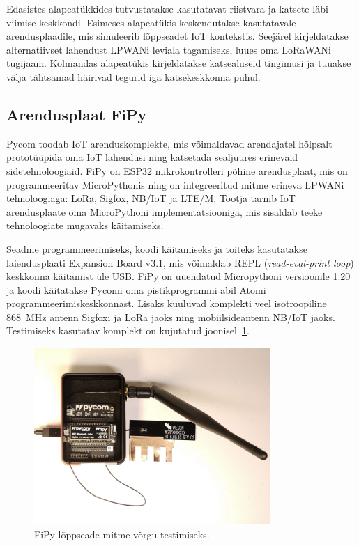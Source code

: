 \documentclass[12pt]{article}
\begin{document}
    Edasistes alapeatükkides tutvustatakse kasutatavat riistvara ja katsete läbi viimise keskkondi.
    Esimeses alapeatükis keskendutakse kasutatavale arendusplaadile, mis simuleerib lõppseadet IoT kontekstis.
    Seejärel kirjeldatakse alternatiivset lahendust LPWANi leviala tagamiseks, luues oma LoRaWANi tugijaam.
    Kolmandas alapeatükis kirjeldatakse katsealuseid tingimusi ja tuuakse välja tähtsamad häirivad tegurid iga katsekeskkonna puhul.

    \subsection{Arendusplaat FiPy}

    Pycom toodab IoT arenduskomplekte, mis võimaldavad arendajatel hõlpsalt prototüüpida oma IoT lahendusi ning katsetada sealjuures erinevaid sidetehnoloogiaid.
    FiPy on ESP32 mikrokontrolleri põhine arendusplaat, mis on programmeeritav MicroPythonis ning on integreeritud mitme erineva LPWANi tehnoloogiaga: LoRa, Sigfox, NB\=/IoT ja LTE\=/M.
    Tootja tarnib IoT arendusplaate oma MicroPythoni implementatsiooniga, mis sisaldab teeke tehnoloogiate mugavaks käitamiseks.

    Seadme programmeerimiseks, koodi käitamiseks ja toiteks kasutatakse laiendusplaati Expansion Board v3.1, mis võimaldab REPL (\textit{read-eval-print loop}) keskkonna käitamist üle USB.
    FiPy on uuendatud Micropythoni versioonile 1.20 ja koodi käitatakse Pycomi oma pistikprogrammi abil Atomi programmeerimiskeskkonnast.
    Lisaks kuuluvad komplekti veel isotroopiline \SI{868}{\mega\hertz} antenn Sigfoxi ja LoRa jaoks ning mobiilsideantenn NB\=/IoT jaoks.
    Testimiseks kasutatav komplekt on kujutatud joonisel~\ref{fig:fipy}.

    \begin{figure} [ht] %
        \begin{center}
            \includegraphics[width=0.8\textwidth]{figures/fipy.jpg}
            \caption{FiPy lõppseade mitme võrgu testimiseks.}
            \label{fig:fipy}
        \end{center}
    \end{figure}
\end{document}
